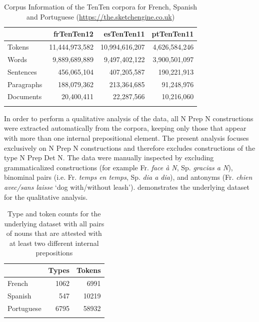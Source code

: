 \documentclass[output=paper]{langsci/langscibook}
\begin{document}
\begin{table}
\caption{Corpus Information of the TenTen corpora for French, Spanish and Portuguese (\url{https://the.sketchengine.co.uk})\label{tab:1:frequencies}}
 \begin{tabular}{lrrr} 
  \lsptoprule
            & frTenTen12 & esTenTen11 & ptTenTen11 \\ 
  \midrule
  Tokens  &   11,444,973,582 &    10,994,616,207     & 4,626,584,246\\
  Words  &   9,889,689,889 &  9,497,402,122 &    3,900,501,097\\
  Sentences  &  456,065,104 &  407,205,587 &    190,221,913\\
  Paragraphs  &  188,079,362 &  213,364,685 &    91,248,976\\
   Documents  &  20,400,411 &  22,287,566 &    10,216,060\\
  \lspbottomrule
 \end{tabular}
\end{table}


In order to perform a qualitative analysis of the data, all N Prep N constructions were extracted automatically from the corpora, keeping only those that appear with more than one internal prepositional element. The present analysis focuses exclusively on N Prep N constructions and therefore excludes constructions of the type N Prep Det N. The data were manually inspected by excluding grammaticalized constructions (for example Fr. \textit{face à N}, Sp. \textit{gracias a N}), binominal pairs (i.e. Fr. \textit{temps en temps}, Sp. \textit{dia a dia}), and antonyms (Fr. \textit{chien avec/sans laisse} `dog with/without leash').  demonstrates the underlying dataset for the qualitative analysis.

\begin{table}
\caption{Type and token counts for the underlying dataset with all pairs of nouns that are attested with at least two different internal prepositions\label{tab:2:frequencies}}
 \begin{tabular}{lrr} 
  \lsptoprule
            & Types & Tokens \\ 
  \midrule
  French  &   1062 &    6991     \\
  Spanish  &  547 &  10219 \\
  Portuguese  &  6795 &  58932 \\
  \lspbottomrule
 \end{tabular}
\end{table}
\end{document}
